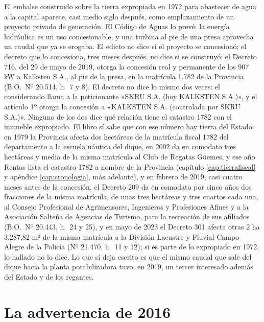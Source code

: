 \begin{cautela}
El embalse construido sobre la tierra expropiada en 1972 para abastecer de agua a la capital aparece, casi medio siglo después, como emplazamiento de un proyecto privado de generación. El Código de Aguas lo prevé: la energía hidráulica es un uso concesionable, y una turbina al pie de una presa aprovecha un caudal que ya se erogaba. El edicto no dice si el proyecto se concesionó; el decreto que lo concesiona, tres meses después, no dice si se construyó: el Decreto 716, del 29 de mayo de 2019, otorga la concesión real y permanente de los 907 kW a Kalksten S.A., al pie de la presa, en la matrícula 1.782 de la Provincia (B.O.\ Nº 20.514, h.\ 7 y 8). El decreto no dice lo mismo dos veces: el considerando llama a la peticionante «SKRU S.A. (hoy KALKSTEN S.A.)», y el artículo 1º otorga la concesión a «KALKSTEN S.A. (controlada por SKRU S.A.)». Ninguno de los dos dice qué relación tiene el catastro 1782 con el inmueble expropiado. El libro sí sabe que con ese número hay tierra del Estado: en 1979 la Provincia afecta dos hectáreas de la matrícula fiscal 1782 del departamento a la escuela náutica del dique, en 2002 da en comodato tres hectáreas y media de la misma matrícula al Club de Regatas Güemes, y ese año Rentas lista el catastro 1782 a nombre de la Provincia (capítulo \ref{cap:tierrafiscal} y apéndice \ref{cap:cronologia}, más adelante), y en febrero de 2019, casi cuatro meses antes de la concesión, el Decreto 209 da en comodato por cinco años dos fracciones de la misma matrícula, de unas tres hectáreas y tres cuartos cada una, al Consejo Profesional de Agrimensores, Ingenieros y Profesiones Afines y a la Asociación Salteña de Agencias de Turismo, para la recreación de sus afiliados (B.O.\ Nº 20.443, h.\ 24 y 25), y en mayo de 2023 el Decreto 301 afecta otras 2 ha 3.287,82 m² de la misma matrícula a la División Lacustre y Fluvial Campo Alegre de la Policía (Nº 21.470, h.\ 11 y 12); si es parte de lo expropiado en 1972, lo hallado no lo dice. Lo que sí deja escrito es que el mismo caudal que sale del dique hacia la planta potabilizadora tuvo, en 2019, un tercer interesado además del Estado y de los regantes. 
\end{cautela}

\section{La advertencia de 2016}

